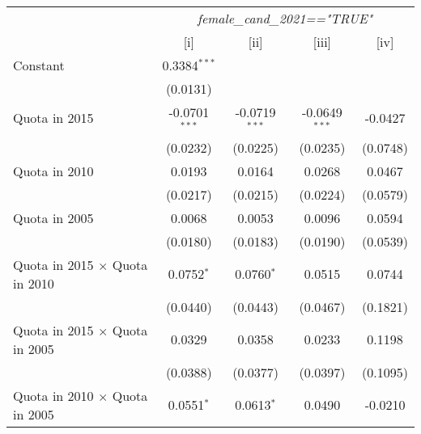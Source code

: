 
\begingroup
\centering
\begin{tabular}{lcccc}
   \toprule
    & \multicolumn{4}{c}{\textit{female\_cand\_2021=="TRUE"}}\\
                                                                 & [i]             & [ii]            & [iii]           & [iv]\\  
   \midrule 
   Constant                                                      & 0.3384$^{***}$  &                 &                 &   \\   
                                                                 & (0.0131)        &                 &                 &   \\   
   Quota in 2015                                                 & -0.0701$^{***}$ & -0.0719$^{***}$ & -0.0649$^{***}$ & -0.0427\\   
                                                                 & (0.0232)        & (0.0225)        & (0.0235)        & (0.0748)\\   
   Quota in 2010                                                 & 0.0193          & 0.0164          & 0.0268          & 0.0467\\   
                                                                 & (0.0217)        & (0.0215)        & (0.0224)        & (0.0579)\\   
   Quota in 2005                                                 & 0.0068          & 0.0053          & 0.0096          & 0.0594\\   
                                                                 & (0.0180)        & (0.0183)        & (0.0190)        & (0.0539)\\   
   Quota in 2015 $\times$ Quota in 2010                          & 0.0752$^{*}$    & 0.0760$^{*}$    & 0.0515          & 0.0744\\   
                                                                 & (0.0440)        & (0.0443)        & (0.0467)        & (0.1821)\\   
   Quota in 2015 $\times$ Quota in 2005                          & 0.0329          & 0.0358          & 0.0233          & 0.1198\\   
                                                                 & (0.0388)        & (0.0377)        & (0.0397)        & (0.1095)\\   
   Quota in 2010 $\times$ Quota in 2005                          & 0.0551$^{*}$    & 0.0613$^{*}$    & 0.0490          & -0.0210\\   

\end{tabular}
